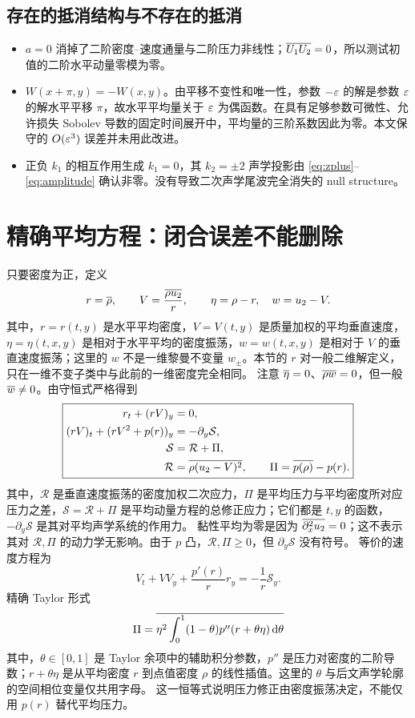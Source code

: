 \subsection{存在的抵消结构与不存在的抵消}
\begin{itemize}
\item $a=0$ 消掉了二阶密度--速度通量与二阶压力非线性；$\overline{U_1U_2}=0$，所以测试初值的二阶水平动量零模为零。
\item $W(x+\pi,y)=-W(x,y)$。由平移不变性和唯一性，参数 $-\varepsilon$ 的解是参数 $\varepsilon$ 的解水平平移 $\pi$，故水平平均量关于 $\varepsilon$ 为偶函数。在具有足够参数可微性、允许损失 Sobolev 导数的固定时间展开中，平均量的三阶系数因此为零。本文保守的 $O(\varepsilon^3)$ 误差并未用此改进。
\item 正负 $k_1$ 的相互作用生成 $k_1=0$，其 $k_2=\pm2$ 声学投影由 \eqref{eq:zplus}--\eqref{eq:amplitude} 确认非零。没有导致二次声学尾波完全消失的 null structure。
\end{itemize}

\section{精确平均方程：闭合误差不能删除}
只要密度为正，定义
\[
 r=\overline{\rho},\qquad V=\frac{\overline{\rho u_2}}r,\qquad
 \eta=\rho-r,\quad w=u_2-V.
\]
其中，$r=r(t,y)$ 是水平平均密度，$V=V(t,y)$ 是质量加权的平均垂直速度，$\eta=\eta(t,x,y)$ 是相对于水平平均的密度振荡，$w=w(t,x,y)$ 是相对于 $V$ 的垂直速度振荡；这里的 $w$ 不是一维黎曼不变量 $w_\pm$。本节的 $r$ 对一般二维解定义，只在一维不变子类中与此前的一维密度完全相同。
注意 $\overline{\eta}=0$、$\overline{\rho w}=0$，但一般 $\overline{w}\ne0$。由守恒式严格得到
\begin{equation}\label{eq:exactmean}
 \boxed{\begin{aligned}
 r_t+(rV)_y&=0,\\
 (rV)_t+(rV^2+p(r))_y&=-\partial_y\mathcal S,\\
 \mathcal S&=\mathcal R+\Pi,\\
 \mathcal R&=\overline{\rho(u_2-V)^2},\qquad
 \Pi=\overline{p(\rho)}-p(r).
 \end{aligned}}
\end{equation}
其中，$\mathcal R$ 是垂直速度振荡的密度加权二次应力，$\Pi$ 是平均压力与平均密度所对应压力之差，$\mathcal S=\mathcal R+\Pi$ 是平均动量方程的总修正应力；它们都是 $t,y$ 的函数，$-\partial_y\mathcal S$ 是其对平均声学系统的作用力。
黏性平均为零是因为 $\overline{\partial_x^2u_2}=0$；这不表示其对 $\mathcal R,\Pi$ 的动力学无影响。由于 $p$ 凸，$\mathcal R,\Pi\ge0$，但 $\partial_y\mathcal S$ 没有符号。
等价的速度方程为
\[
 V_t+VV_y+\frac{p'(r)}r r_y=-\frac1r\mathcal S_y.
\]
精确 Taylor 形式
\[
 \Pi=\overline{\eta^2\int_0^1(1-\theta)p''(r+\theta\eta)\,\mathrm d\theta}
\]
其中，$\theta\in[0,1]$ 是 Taylor 余项中的辅助积分参数，$p''$ 是压力对密度的二阶导数；$r+\theta\eta$ 是从平均密度 $r$ 到点值密度 $\rho$ 的线性插值。这里的 $\theta$ 与后文声学轮廓的空间相位变量仅共用字母。
这一恒等式说明压力修正由密度振荡决定，不能仅用 $p(r)$ 替代平均压力。

